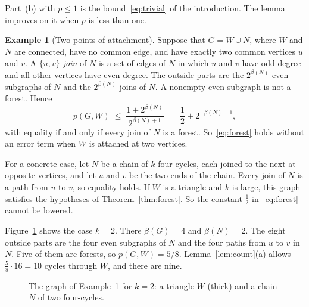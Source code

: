 \documentclass[11pt]{article}
\theoremstyle{definition}
\newtheorem{example}[theorem]{Example}
\theoremstyle{remark}
\newcommand{\half}{\tfrac12}
\numberwithin{equation}{section}
\begin{document}
Part~(b) with $p\le1$ is the bound~\eqref{eq:trivial} of the introduction. The lemma improves on
it when $p$ is less than one.

\begin{example}[Two points of attachment]\label{rem:twoports}
Suppose that $G=W\cup N$, where $W$ and $N$ are connected, have no common edge, and have exactly two
common vertices $u$ and $v$. A \emph{$\{u,v\}$-join} of $N$ is a set of edges of $N$ in which $u$
and $v$ have odd degree and all other vertices have even degree. The outside parts are the
$2^{\beta(N)}$ even subgraphs of $N$ and the $2^{\beta(N)}$ joins of $N$. A nonempty even subgraph
is not a forest. Hence
\[
  p(G,W)\;\le\;\frac{1+2^{\beta(N)}}{2^{\beta(N)+1}}\;=\;\frac12+2^{-\beta(N)-1},
\]
with equality if and only if every join of $N$ is a forest. So~\eqref{eq:forest} holds without an
error term when $W$ is attached at two vertices.

For a concrete case, let $N$ be a chain of $k$ four-cycles, each joined to the next at opposite
vertices, and let $u$ and $v$ be the two ends of the chain. Every join of $N$ is a path from $u$ to
$v$, so equality holds. If $W$ is a triangle and $k$ is large, this graph satisfies the hypotheses
of Theorem~\ref{thm:forest}. So the constant $\half$ in~\eqref{eq:forest} cannot be lowered.

Figure~\ref{fig:twoports} shows the case $k=2$. There $\beta(G)=4$ and $\beta(N)=2$. The eight
outside parts are the four even subgraphs of $N$ and the four paths from $u$ to $v$ in $N$. Five of
them are forests, so $p(G,W)=5/8$. Lemma~\ref{lem:count}(a) allows $\frac58\cdot16=10$ cycles
through $W$, and there are nine.
\end{example}

\begin{figure}[ht]
\centering
{}
\caption{The graph of Example~\ref{rem:twoports} for $k=2$: a triangle $W$ (thick) and a chain $N$
of two four-cycles.}
\label{fig:twoports}
\end{figure}
\end{document}
